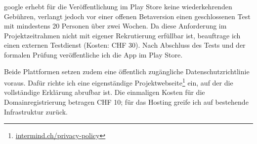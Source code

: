 \gls{google} erhebt für die Veröffentlichung im Play Store keine wiederkehrenden Gebühren, verlangt jedoch vor einer offenen Betaversion einen geschlossenen Test mit mindestens 20 Personen über zwei Wochen. Da diese Anforderung im Projektzeitrahmen nicht mit eigener Rekrutierung erfüllbar ist, beauftrage ich einen externen Testdienst (Kosten: CHF 30). Nach Abschluss des Tests und der formalen Prüfung veröffentliche ich die App im Play Store.

Beide Plattformen setzen zudem eine öffentlich zugängliche Datenschutzrichtlinie voraus. Dafür richte ich eine eigenständige Projektwebseite\footnote{\href{https://intermind.ch/privacy-policy.html?lang=de}{intermind.ch/privacy-policy}} ein, auf der die vollständige Erklärung abrufbar ist. Die einmaligen Kosten für die Domainregistrierung betragen CHF 10; für das Hosting greife ich auf bestehende Infrastruktur zurück.

% 
% 
% 
% 
% 
% 